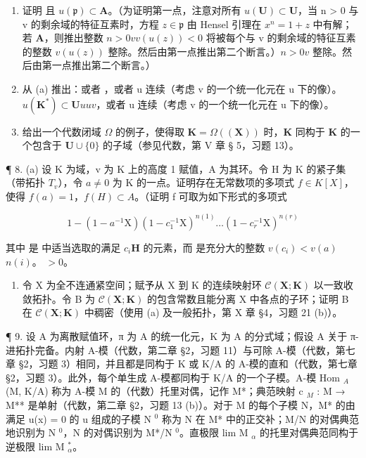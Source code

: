 \begin{enumerate}
\def\labelenumi{(\alph{enumi})}
\item
  证明  且 \(u(\mathfrak{p}) \subset \mathbf{A}\)。（为证明第一点，注意对所有 \(u(\mathbf{U}) \subset \mathbf{U}\)，当 n > 0 与 v 的剩余域的特征互素时，方程 \(z \in \mathfrak{p}\) 由 Hensel 引理在 \(x^n = 1 + z\) 中有解；若 \(\mathbf{A}\)，则推出整数 \(n > 0\)\(v\)\(v(u(z)) < 0\) 将被每个与 v 的剩余域的特征互素的整数 \(v(u(z))\) 整除。然后由第一点推出第二个断言。）\(n > 0\)\(v\) 整除。然后由第一点推出第二个断言。）
\item
  从 (a) 推出：或者 ，或者 u 连续（考虑 v 的一个统一化元在 u 下的像）。\(u(\mathbf{K}^*) \subset \mathbf{U}\)\(u\)\(u\)\(v\)，或者 u 连续（考虑 v 的一个统一化元在 u 下的像）。
\item
  给出一个代数闭域 \(\Omega\) 的例子，使得取 \(\mathbf{K} = \Omega((\mathbf{X}))\) 时，\(\mathbf{K}\) 同构于 \(\mathbf{K}\) 的一个包含于 \(\mathbf{U} \cup \{0\}\) 的子域（参见代数，第 V 章 § 5，习题 13）。
\end{enumerate}

¶ 8. (a) 设 K 为域，v 为 K 上的高度 1 赋值，A 为其环。令 H 为 K 的紧子集（带拓扑 \(T_{v}\)），令 \(a \neq 0\) 为 K 的一点。证明存在无常数项的多项式 \(f \in K[X]\)，使得 \(f(a) = 1\)，\(f(H) \subset A\)。（证明 f 可取为如下形式的多项式

\[
1 - (1 - a ^ {- 1} \mathrm{X}) (1 - c _ {1} ^ {- 1} \mathrm{X}) ^ {n (1)} \dots (1 - c _ {r} ^ {- 1} \mathrm{X}) ^ {n (r)}
\]

其中  是  中适当选取的满足 \(c_{i}\)\(\mathbf{H}\) 的元素，而  是充分大的整数 \(v(c_{i}) < v(a)\)\(n(i)\)。 \(>0\)。 

\begin{enumerate}
\def\labelenumi{(\alph{enumi})}
\setcounter{enumi}{1}
\tightlist
\item
  令 X 为全不连通紧空间；赋予从 X 到 K 的连续映射环 \(\mathcal{C}(\mathbf{X};\mathbf{K})\) 以一致收敛拓扑。令 B 为 \(\mathcal{C}(\mathbf{X};\mathbf{K})\) 的包含常数且能分离 X 中各点的子环；证明 B 在 \(\mathcal{C}(\mathbf{X};\mathbf{K})\) 中稠密（使用 (a) 及一般拓扑，第 X 章 §4，习题 21 (b)）。
\end{enumerate}

¶ 9. 设 A 为离散赋值环，π 为 A 的统一化元，K 为 A 的分式域；假设 A 关于 π-进拓扑完备。内射 A-模（代数，第二章 §2，习题 11）与可除 A-模（代数，第七章 §2，习题 3）相同，并且都是同构于 K 或 K/A 的 A-模的直和（代数，第七章 §2，习题 3）。此外，每个单生成 A-模都同构于 K/A 的一个子模。A-模 Hom \(_{A}\) (M, K/A) 称为 A-模 M 的（代数）托里对偶，记作 M*；典范映射 c \(_{M}\) : M → M** 是单射（代数，第二章 §2，习题 13 (b)）。对于 M 的每个子模 N，M* 的由满足 u(x) = 0 的 u 组成的子模 N \(^{0}\) 称为 N 在 M* 中的正交补；M/N 的对偶典范地识别为 N \(^{0}\)，N 的对偶识别为 M*/N \(^{0}\)。直极限 lim M \(_{\alpha}\) 的托里对偶典范同构于逆极限 lim M \(_{\alpha}^{*}\)。

